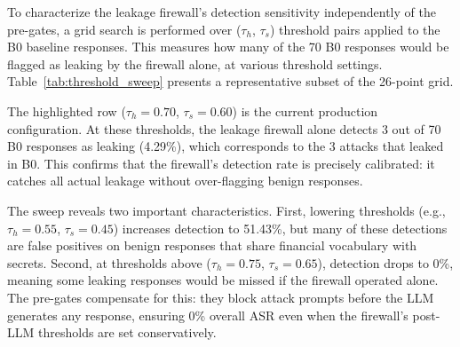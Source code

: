 \documentclass[journal,12pt,onecolumn,draftclsnofoot]{IEEEtran}
\begin{document}
To characterize the leakage firewall's detection sensitivity independently of the pre-gates, a grid search is performed over ($\tau_h$, $\tau_s$) threshold pairs applied to the B0 baseline responses. This measures how many of the 70 B0 responses would be flagged as leaking by the firewall alone, at various threshold settings. Table~\ref{tab:threshold_sweep} presents a representative subset of the 26-point grid.

\begin{table}[!ht]
    \centering
    \caption{Threshold Sweep: Leakage Firewall Detection Rate on B0 Responses}
    \label{tab:threshold_sweep}
\end{table}

The highlighted row ($\tau_h = 0.70$, $\tau_s = 0.60$) is the current production configuration. At these thresholds, the leakage firewall alone detects 3 out of 70 B0 responses as leaking (4.29\%), which corresponds to the 3 attacks that leaked in B0. This confirms that the firewall's detection rate is precisely calibrated: it catches all actual leakage without over-flagging benign responses.

The sweep reveals two important characteristics. First, lowering thresholds (e.g., $\tau_h = 0.55$, $\tau_s = 0.45$) increases detection to 51.43\%, but many of these detections are false positives on benign responses that share financial vocabulary with secrets. Second, at thresholds above ($\tau_h = 0.75$, $\tau_s = 0.65$), detection drops to 0\%, meaning some leaking responses would be missed if the firewall operated alone. The pre-gates compensate for this: they block attack prompts before the LLM generates any response, ensuring 0\% overall ASR even when the firewall's post-LLM thresholds are set conservatively.
\end{document}
